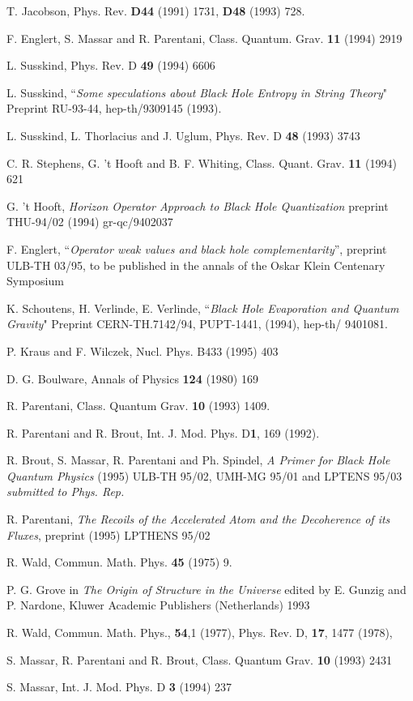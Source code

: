 \begin{thebibliography}{99}
 T. Jacobson, Phys. Rev.
 {\bf D44} (1991) 1731, {\bf D48} (1993) 728.


F. Englert, S. Massar and R. Parentani,
 Class. Quantum. Grav. {\bf 11} (1994) 2919

 L. Susskind, Phys. Rev. D {\bf 49} (1994) 6606


 L. Susskind,
``{\it Some speculations about Black Hole Entropy in String Theory}"
Preprint RU-93-44, hep-th/9309145 (1993).

 L. Susskind, L. Thorlacius  and J. Uglum, Phys. Rev. D {\bf 48}
(1993) 3743

C. R. Stephens, G. 't Hooft and B. F. Whiting,
Class. Quant. Grav. {\bf 11} (1994) 621

G. 't Hooft,
{\em Horizon Operator Approach to Black Hole Quantization}
preprint THU-94/02 (1994) gr-qc/9402037

F. Englert, ``{\it Operator weak values and black hole
complementarity}'', preprint ULB-TH 03/95, to be published in the annals of
the Oskar Klein Centenary Symposium

 K. Schoutens, H. Verlinde,
 E. Verlinde, ``{\it Black Hole Evaporation and Quantum Gravity}"
Preprint CERN-TH.7142/94, PUPT-1441, (1994), hep-th/ 9401081.

 P. Kraus and F. Wilczek,
Nucl. Phys. B433 (1995) 403

D. G. Boulware, Annals of Physics {\bf 124} (1980) 169

 R. Parentani,
  Class. Quantum Grav. {\bf 10} (1993) 1409.

R. Parentani and R. Brout, Int. J. Mod. Phys. D{\bf 1}, 169
(1992).

 R. Brout, S. Massar, R. Parentani and Ph. Spindel, {\em A
Primer for Black Hole Quantum Physics} (1995) ULB-TH 95/02, UMH-MG 95/01 and
LPTENS 95/03 {\em submitted to Phys. Rep.}

R. Parentani, {\em The Recoils of the Accelerated Atom
and the Decoherence of its Fluxes}, preprint (1995) LPTHENS 95/02

 R. Wald, Commun. Math. Phys. {\bf 45} (1975) 9.

 P. G. Grove
in {\it The Origin of Structure in the Universe} edited by E.
Gunzig and P. Nardone, Kluwer Academic Publishers (Netherlands) 1993

 R. Wald, Commun. Math. Phys., {\bf 54},1 (1977),
Phys. Rev. D, {\bf 17}, 1477 (1978),

 S. Massar, R. Parentani and R. Brout, Class. Quantum
Grav. {\bf 10} (1993) 2431

 S. Massar, Int. J. Mod. Phys. D {\bf 3} (1994) 237

\end{thebibliography}

